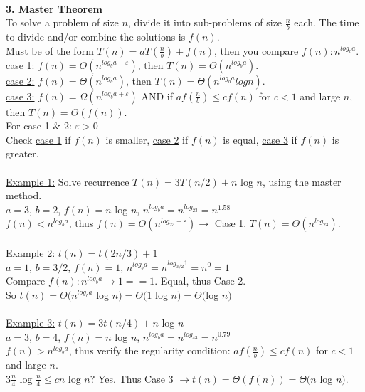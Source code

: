 \documentclass[8pt,letterpaper,twocolumn]{article}
\begin{document}
\\
\textbf{3. Master Theorem}\\
To solve a problem of size $n$, divide it into sub-problems of size $\frac{n}{b}$ each. The time to divide and/or combine the solutions is $f(n)$.\\
Must be of the form $T(n)=aT(\frac{n}{b})+f(n)$, then you compare $f(n) : n^{log_ba}$. \\
\underline{case 1:} $f(n) = O(n^{log_ba-\varepsilon})$, then $T(n)=\Theta(n^{log_ba})$. \\
\underline{case 2:} $f(n) = \Theta(n^{log_ba})$, then $T(n) = \Theta(n^{log_ba}logn)$. \\
\underline{case 3:} $f(n) = \Omega(n^{log_ba+\varepsilon})$ AND if $af(\frac{n}{b}) \leq cf(n)$ for $c<1$ and large $n$, then $T(n) = \Theta(f(n))$. \\
For case 1 \& 2: $\varepsilon > 0$ \\
Check \underline{case 1} if $f(n)$ is smaller, \underline{case 2} if $f(n)$ is equal, \underline{case 3} if $f(n)$ is greater.\\
\\
\underline{Example 1:} Solve recurrence $T(n) = 3T(n/2) + n$ log $n$, using the master method.\\
$a = 3$, $b = 2$, $f(n)=n$ log $n$, $n^{log_ba}=n^{log_23}=n^{1.58}$\\
$f(n) < n^{log_ba}$, thus $f(n) = O(n^{log_23 - \varepsilon}) \rightarrow$ Case 1. $T(n) = \Theta(n^{log_23})$.\\
\\
\underline{Example 2:} $t(n)=t(2n/3)+1$\\
$a = 1$, $b = 3/2$, $f(n) = 1$, $n^{log_ba} = n^{log_{3/2}1} = n^0 = 1$\\
Compare $f(n) : n^{log_ba} \rightarrow 1 == 1$. Equal, thus Case 2.\\
So $t(n) = \Theta(n^{log_ba}$ log $n) = \Theta(1$ log $n) = \Theta($log $n)$\\
\\
\underline{Example 3:} $t(n)=3t(n/4)+n$ log $n$\\
$a = 3$, $b = 4$, $f(n)=n$ log $n$, $n^{log_ba}=n^{log_43}=n^{0.79}$\\
$f(n) > n^{log_ba}$, thus verify the regularity condition: $af(\frac{n}{b}) \leq cf(n)$ for $c<1$ and large $n$.\\
$3\frac{n}{4}$ log $\frac{n}{4} \leq cn$ log $n$? Yes. Thus Case 3 $\rightarrow t(n)=\Theta(f(n))=\Theta(n$ log $n)$.\\
\end{document}
